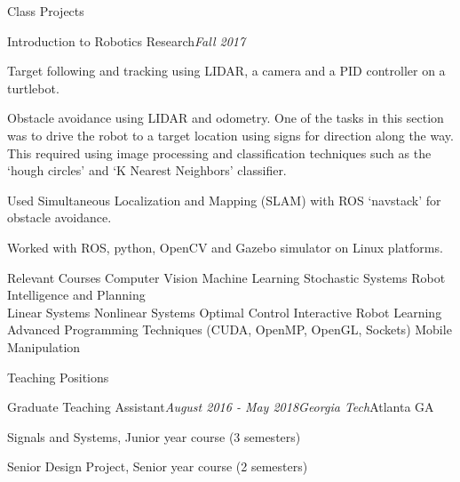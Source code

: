 \documentclass{resume} %
\begin{document}
\begin{rSection}{Class Projects}
\begin{rSubsection}{Introduction to Robotics Research}{\em Fall 2017}{}{}
\item Target following and tracking using LIDAR, a camera and a PID controller on a turtlebot.
\item Obstacle avoidance using LIDAR and odometry. One of the tasks in this section was to drive
the robot to a target location using signs for direction along the way. This required using image
processing and classification techniques such as the ‘hough circles’ and ‘K Nearest Neighbors’
classifier.
\item Used Simultaneous Localization and Mapping (SLAM) with ROS ‘navstack’ for obstacle
avoidance.
\item Worked with ROS, python, OpenCV and Gazebo simulator on Linux platforms.
\end{rSubsection}

\end{rSection}


\begin{rSection}{Relevant Courses}
Computer Vision  \hspace{20 pt} Machine Learning \hspace{26 pt} Stochastic Systems \hspace{10 pt}  Robot Intelligence and Planning
\\
Linear Systems \hspace{30 pt} Nonlinear Systems \hspace{20 pt} Optimal Control \hspace{22 pt} Interactive Robot Learning
\\
Advanced Programming Techniques ({\scriptsize CUDA, OpenMP, OpenGL, Sockets}) \hspace{10 pt} Mobile Manipulation


\end{rSection}



\begin{rSection}{Teaching Positions}

\begin{rSubsection}{Graduate Teaching Assistant}{\em August 2016 - May 2018}{\em Georgia Tech}{Atlanta GA}
\item Signals and Systems, Junior year course (3 semesters)
\item Senior Design Project, Senior year course (2 semesters)
\end{rSubsection}

\end{rSection}
\end{document}
